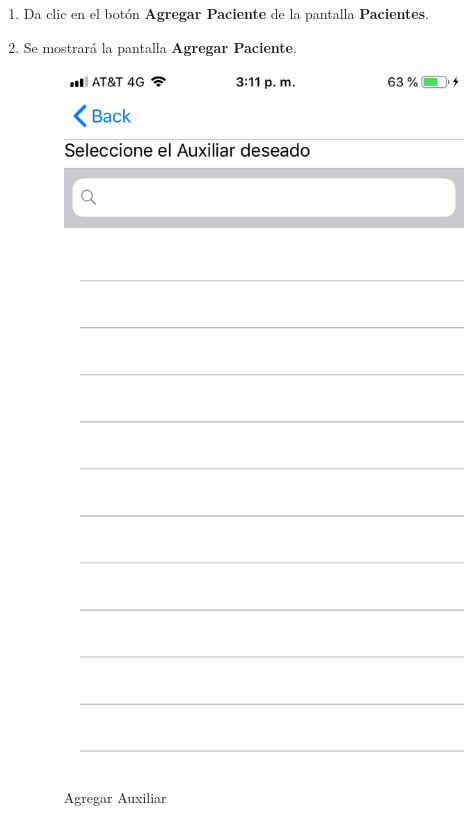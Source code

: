 \begin{enumerate}
	\item Da clic en el botón \textbf{Agregar Paciente} de la pantalla \textbf{Pacientes}.
	
	\item Se mostrará la pantalla \textbf{Agregar Paciente}.
	
	\begin{figure}[!htbp]			
		\hypertarget{fig:AgregarAuxiliar}{\hspace{1pt}}
		\begin{center}
			\includegraphics[height=0.4\textheight]{Paciente/AgregarAuxiliar/images/AgregarAuxiliar}
			\caption{Agregar Auxiliar}
			\label{fig:AgregarAuxiliar}
		\end{center}
	\end{figure}


\end{enumerate}
